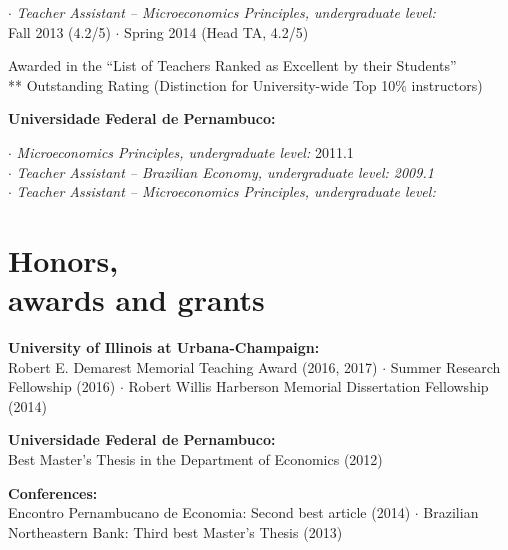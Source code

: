 \documentclass[mm, 10pt]{simple_style}
\begin{document}
\begin{resume}
\clearpage
$\cdot$ \textit{Teacher Assistant -- Microeconomics Principles, undergraduate level:} \\
\indent \hspace{1cm}  Fall 2013 (4.2/5) $\cdot$ Spring 2014 (Head TA, 4.2/5)

{\small * Awarded in the ``List of Teachers Ranked as Excellent by their Students'' \\
** Outstanding Rating (Distinction for University-wide Top 10\% instructors)}

\textbf{Universidade Federal de Pernambuco:}

$\cdot$ \textit{Microeconomics Principles, undergraduate level:} 2011.1\\
$\cdot$ \textit{Teacher Assistant -- Brazilian Economy, undergraduate level: 2009.1}\\
$\cdot$ \textit{Teacher Assistant -- Microeconomics Principles, undergraduate level:}

\section{Honors,\\ awards and grants}

\textbf{University of Illinois at Urbana-Champaign:} \\
Robert E. Demarest Memorial Teaching Award (2016, 2017) 
$\cdot$ Summer Research Fellowship (2016)
$\cdot$ Robert Willis Harberson Memorial Dissertation Fellowship (2014)

\textbf{Universidade Federal de Pernambuco:} \\
Best Master’s Thesis in the Department of Economics (2012)

\textbf{Conferences:}\\
Encontro Pernambucano de Economia: Second best article (2014)
$\cdot$ Brazilian Northeastern Bank: Third best Master’s Thesis (2013)





\end{resume}
\end{document}
